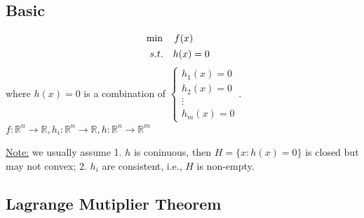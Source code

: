 \documentclass[11pt,a4paper]{article}
\begin{document}
\subsection{Basic}
\begin{align*}
    &\min\quad f(x)\\
    &\begin{array}{r@{\quad}r@{}l@{\quad}l}
    s.t.
    &h(x)=0&\\
\end{array}
\end{align*}
where $h(x)=0$ is a combination of $\left\{\begin{matrix}
    h_1(x)=0\\
    h_2(x)=0\\
    \vdots\\
    h_m(x)=0
\end{matrix}\right.$. $f:\mathbb{R}^n \rightarrow \mathbb{R}, h_i:\mathbb{R}^n \rightarrow \mathbb{R}, h:\mathbb{R}^n \rightarrow \mathbb{R}^m$

\underline{Note:} we usually assume 1. $h$ is coninuous, then $H=\{x:h(x)=0\}$ is closed but may not convex; 2. $h_i$ are consistent, i.e., $H$ is non-empty.

\subsection{Lagrange Mutiplier Theorem}
\end{document}
